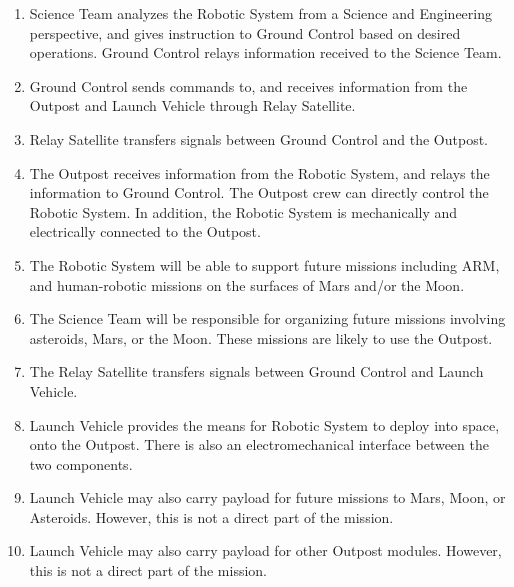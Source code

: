 \documentclass[12pt, letter]{article}
\begin{document}
\begin{enumerate}
\item{Science Team analyzes the Robotic System from a Science and Engineering perspective, and gives instruction to Ground Control based on desired operations. Ground Control relays information received to the Science Team.}
\item{Ground Control sends commands to, and receives information from the Outpost and Launch Vehicle through Relay Satellite.}
\item{Relay Satellite transfers signals between Ground Control and the Outpost.}
\item{The Outpost receives information from the Robotic System, and relays the information to Ground Control. The Outpost crew can directly control the Robotic System. In addition, the Robotic System is mechanically and electrically connected to the Outpost.}
\item{The Robotic System will be able to support future missions including ARM, and human-robotic missions on the surfaces of Mars and/or the Moon.}
\item{The Science Team will be responsible for organizing future missions involving asteroids, Mars, or the Moon. These missions are likely to use the Outpost.}
\item{The Relay Satellite transfers signals between Ground Control and Launch Vehicle.}
\item{Launch Vehicle provides the means for Robotic System to deploy into space, onto the Outpost. There is also an electromechanical interface between the two components.}
\item{Launch Vehicle may also carry payload for future missions to Mars, Moon, or Asteroids. However, this is not a direct part of the mission.}
\item{Launch Vehicle may also carry payload for other Outpost modules. However, this is not a direct part of the mission.}
\end{enumerate}

\end{document}
